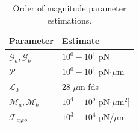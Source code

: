 \begin{table}[t!]
\caption{Order of magnitude parameter estimations.}\centering \label{tab:OoMest} 
\begin{tabular}{ l  l}
\hline
Parameter  & Estimate \\
\hline
$\mathcal{G}_a, \mathcal{G}_b$ & $10^0 - 10^1$ pN \\
$\mathcal{P}$ & $10^0 - 10^1$ pN$\cdot \mu$m \\
$\mathcal{L}_0$ &  28 $\mu$m  fds\\
$\mathcal{M}_a, \mathcal{M}_b $ & $10^4 - 10^5$ pN$\cdot \mu$m$^2$] \\
$\mathcal{F}_{cyto}$ &$10^3 - 10^4$ pN/$\mu$m \\
\hline
\end{tabular}
\end{table}

